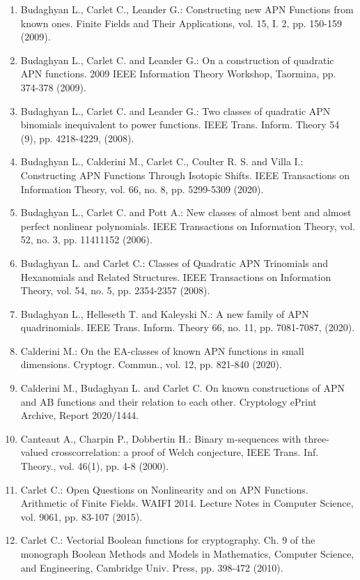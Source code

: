 \documentclass[10pt]{article}
\begin{document}
\begin{enumerate}
  \item Budaghyan L., Carlet C., Leander G.: Constructing new APN Functions from known ones. Finite Fields and Their Applications, vol. 15, I. 2, pp. 150-159 (2009).
  \item Budaghyan L., Carlet C. and Leander G.: On a construction of quadratic APN functions. 2009 IEEE Information Theory Workshop, Taormina, pp. 374-378 (2009).
  \item Budaghyan L., Carlet C. and Leander G.: Two classes of quadratic APN binomials inequivalent to power functions. IEEE Trans. Inform. Theory 54 (9), pp. 4218-4229, (2008).
  \item Budaghyan L., Calderini M., Carlet C., Coulter R. S. and Villa I.: Constructing APN Functions Through Isotopic Shifts. IEEE Transactions on Information Theory, vol. 66, no. 8, pp. 5299-5309 (2020).
  \item Budaghyan L., Carlet C. and Pott A.: New classes of almost bent and almost perfect nonlinear polynomials. IEEE Transactions on Information Theory, vol. 52, no. 3, pp. 11411152 (2006).
  \item Budaghyan L. and Carlet C.: Classes of Quadratic APN Trinomials and Hexanomials and Related Structures. IEEE Transactions on Information Theory, vol. 54, no. 5, pp. 2354-2357 (2008).
  \item Budaghyan L., Helleseth T. and Kaleyski N.: A new family of APN quadrinomials. IEEE Trans. Inform. Theory 66, no. 11, pp. 7081-7087, (2020).
  \item Calderini M.: On the EA-classes of known APN functions in small dimensions. Cryptogr. Commun., vol. 12, pp. 821-840 (2020).
  \item Calderini M., Budaghyan L. and Carlet C. On known constructions of APN and AB functions and their relation to each other. Cryptology ePrint Archive, Report 2020/1444.
  \item Canteaut A., Charpin P., Dobbertin H.: Binary m-sequences with three-valued crosscorrelation: a proof of Welch conjecture, IEEE Trans. Inf. Theory., vol. 46(1), pp. 4-8 (2000).
  \item Carlet C.: Open Questions on Nonlinearity and on APN Functions. Arithmetic of Finite Fields. WAIFI 2014. Lecture Notes in Computer Science, vol. 9061, pp. 83-107 (2015).
  \item Carlet C.: Vectorial Boolean functions for cryptography. Ch. 9 of the monograph Boolean Methods and Models in Mathematics, Computer Science, and Engineering, Cambridge Univ. Press, pp. 398-472 (2010).

\end{enumerate}
\end{document}
